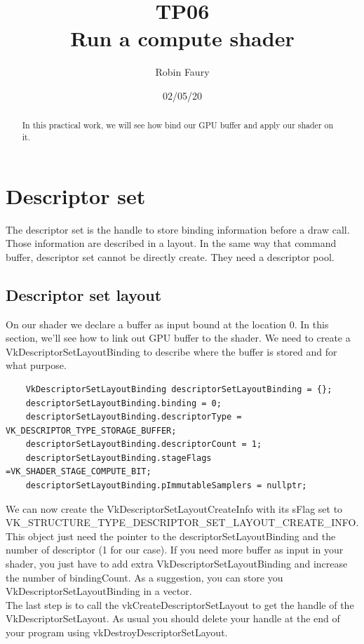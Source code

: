 \documentclass{article}
\begin{document}
\title{TP06\\Run a compute shader}
\author{Robin Faury}
\date{02/05/20}
\maketitle

\begin{abstract}
	In this practical work, we will see how bind our GPU buffer and apply our shader on it.
\end{abstract}

\section{Descriptor set}
The descriptor set is the handle to store binding information before a draw call. Those information are described in a layout. In the same way that command buffer, descriptor set cannot be directly create. They need a descriptor pool.
\subsection{Descriptor set layout}
On our shader we declare a buffer as input bound at the location 0. In this section, we'll see how to link out GPU buffer to the shader. We need to create a VkDescriptorSetLayoutBinding to describe where the buffer is stored and for what purpose.

\begin{lstlisting}
	VkDescriptorSetLayoutBinding descriptorSetLayoutBinding = {};
	descriptorSetLayoutBinding.binding = 0;
	descriptorSetLayoutBinding.descriptorType = VK_DESCRIPTOR_TYPE_STORAGE_BUFFER;
	descriptorSetLayoutBinding.descriptorCount = 1;
	descriptorSetLayoutBinding.stageFlags =VK_SHADER_STAGE_COMPUTE_BIT;
	descriptorSetLayoutBinding.pImmutableSamplers = nullptr;
\end{lstlisting}

We can now create the VkDescriptorSetLayoutCreateInfo with its sFlag set to \\VK\_STRUCTURE\_TYPE\_DESCRIPTOR\_SET\_LAYOUT\_CREATE\_INFO. This object just need the pointer to the descriptorSetLayoutBinding and the number of descriptor (1 for our case). If you need more buffer as input in your shader, you just have to add extra VkDescriptorSetLayoutBinding and increase the number of bindingCount. As a suggestion, you can store you VkDescriptorSetLayoutBinding in a vector.\\
The last step is to call the vkCreateDescriptorSetLayout to get the handle of the VkDescriptorSetLayout. As usual you should delete your handle at the end of your program using vkDestroyDescriptorSetLayout.
\end{document}
